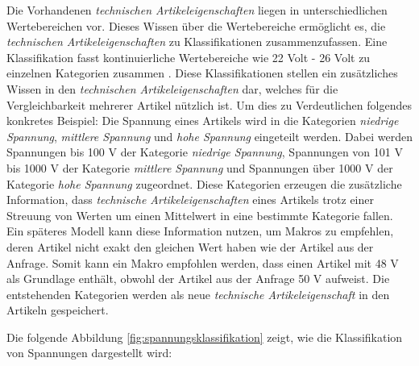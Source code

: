 Die Vorhandenen \textit{technischen Artikeleigenschaften} liegen in unterschiedlichen Wertebereichen vor. 
Dieses Wissen über die Wertebereiche ermöglicht es, die \textit{technischen Artikeleigenschaften} zu Klassifikationen zusammenzufassen.
Eine Klassifikation fasst kontinuierliche Wertebereiche wie 22 Volt - 26 Volt zu einzelnen Kategorien zusammen \cite{fayyad1993discretization}.
Diese Klassifikationen stellen ein zusätzliches Wissen in den \textit{technischen Artikeleigenschaften} dar, welches für die Vergleichbarkeit mehrerer Artikel nützlich ist.
Um dies zu Verdeutlichen folgendes konkretes Beispiel: Die Spannung eines Artikels wird in die Kategorien \textit{niedrige Spannung}, \textit{mittlere Spannung} und \textit{hohe Spannung} eingeteilt werden.
Dabei werden Spannungen bis 100 V der Kategorie \textit{niedrige Spannung}, Spannungen von 101 V bis 1000 V der Kategorie \textit{mittlere Spannung} und Spannungen über 1000 V der Kategorie \textit{hohe Spannung} zugeordnet.
Diese Kategorien erzeugen die zusätzliche Information, dass \textit{technische Artikeleigenschaften} eines Artikels trotz einer Streuung von Werten um einen Mittelwert in eine bestimmte Kategorie fallen.
Ein späteres Modell kann diese Information nutzen, um Makros zu empfehlen, deren Artikel nicht exakt den gleichen Wert haben wie der Artikel aus der Anfrage. 
Somit kann ein Makro empfohlen werden, dass einen Artikel mit 48 V als Grundlage enthält, obwohl der Artikel aus der Anfrage 50 V aufweist. 
Die entstehenden Kategorien werden als neue \textit{technische Artikeleigenschaft} in den Artikeln gespeichert.

Die folgende Abbildung \ref{fig:spannungsklassifikation} zeigt, wie die Klassifikation von Spannungen dargestellt wird: 

